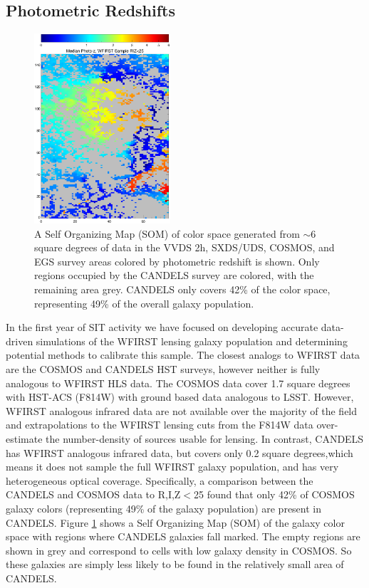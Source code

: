 \subsection{Photometric Redshifts}
\label{sec:wl_calibration}

\begin{figure} 
\centering
 \includegraphics[width=0.45\textwidth] {./plots/wfirst_color_dist.eps}
\caption{A Self Organizing Map (SOM) \citep{Masters2015} of color space generated from $\sim6$ square degrees of data in the VVDS 2h, SXDS/UDS, COSMOS, and EGS survey areas colored by photometric redshift is shown.  Only regions occupied by the CANDELS survey are colored, with the remaining area grey.  CANDELS only covers 42\% of the color space, representing 49\% of the overall galaxy population.  }
\label{fig:EuclidCandelsRep}
\end{figure}

 In the first year of SIT activity we have focused on developing accurate data-driven simulations of the WFIRST lensing galaxy population and determining potential methods to calibrate this sample.  The closest analogs to WFIRST data are the COSMOS and CANDELS HST surveys, however neither is fully analogous to WFIRST HLS data.  The COSMOS data cover 1.7 square degrees with HST-ACS (F814W) with ground based data analogous to LSST.  However, WFIRST analogous infrared data are not available over the majority of the field and extrapolations to the WFIRST lensing cuts from the F814W data over-estimate the number-density of sources usable for lensing.  In contrast, CANDELS has WFIRST analogous infrared data, but covers only 0.2 square degrees,which means it does not sample the full WFIRST galaxy population, and has very heterogeneous optical coverage.  Specifically, a comparison between the CANDELS and COSMOS data to R,I,Z$<$25 found that only 42\% of COSMOS galaxy colors (representing 49\% of the galaxy population) are present in CANDELS.  Figure \ref{fig:EuclidCandelsRep} shows a Self Organizing Map (SOM) \citep{Masters2015} of the galaxy color space with regions where CANDELS galaxies fall marked.  The empty regions are shown in grey and correspond to cells with low galaxy density in COSMOS.  So these galaxies are simply less likely to be found in the relatively small area of CANDELS. 


